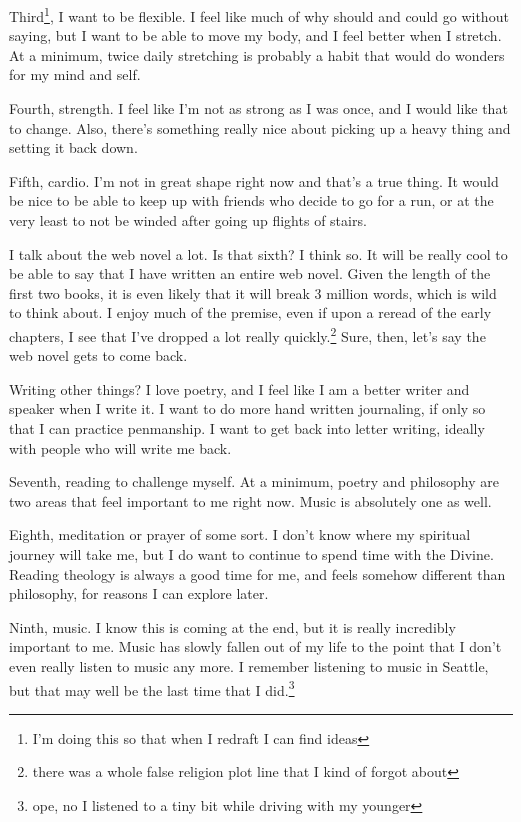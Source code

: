 \documentclass[12pt]{article}
\renewcommand{\,}{\textsuperscript{,}}
\begin{document}
Third\footnote{I'm doing this so that when I redraft I can find ideas}, I want to be flexible.
I feel like much of why should and could go without saying, but I want to be able to move my body, and I feel better when I stretch.
At a minimum, twice daily stretching is probably a habit that would do wonders for my mind and self.

Fourth, strength.
I feel like I'm not as strong as I was once, and I would like that to change.
Also, there's something really nice about picking up a heavy thing and setting it back down.

Fifth, cardio.
I'm not in great shape right now and that's a true thing.
It would be nice to be able to keep up with friends who decide to go for a run, or at the very least to not be winded after going up flights of stairs.

I talk about the web novel a lot.
Is that sixth?
I think so.
It will be really cool to be able to say that I have written an entire web novel.
Given the length of the first two books, it is even likely that it will break 3 million words, which is wild to think about.
I enjoy much of the premise, even if upon a reread of the early chapters, I see that I've dropped a lot really quickly.\footnote{there was a whole false religion plot line that I kind of forgot about}
Sure, then, let's say the web novel gets to come back.

Writing other things?
I love poetry, and I feel like I am a better writer and speaker when I write it.
I want to do more hand written journaling, if only so that I can practice penmanship.
I want to get back into letter writing, ideally with people who will write me back.

Seventh, reading to challenge myself.
At a minimum, poetry and philosophy are two areas that feel important to me right now.
Music is absolutely one as well.

Eighth, meditation or prayer of some sort.
I don't know where my spiritual journey will take me, but I do want to continue to spend time with the Divine.
Reading theology is always a good time for me, and feels somehow different than philosophy, for reasons I can explore later.

Ninth, music.
I know this is coming at the end, but it is really incredibly important to me.
Music has slowly fallen out of my life to the point that I don't even really listen to music any more.
I remember listening to music in Seattle, but that may well be the last time that I did.\footnote{ope, no I listened to a tiny bit while driving with my younger}
\end{document}
